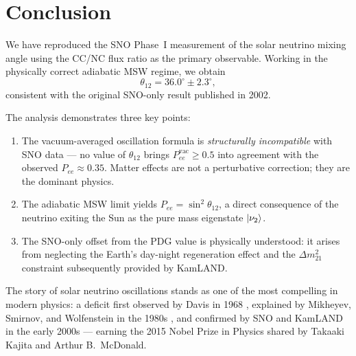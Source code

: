 \documentclass[12pt, a4paper]{article}
\begin{document}
\section{Conclusion}
\label{sec:conclusion}
 
We have reproduced the SNO Phase~I measurement of the solar neutrino
mixing angle using the CC/NC flux ratio as the primary observable.
Working in the physically correct adiabatic MSW regime, we obtain
\[
    \theta_{12} = 36.0^{\circ} \pm 2.3^{\circ},
\]
consistent with the original SNO-only result published in 2002.
 
The analysis demonstrates three key points:
\begin{enumerate}
    \item The vacuum-averaged oscillation formula is \emph{structurally
          incompatible} with SNO data --- no value of $\theta_{12}$
          brings $P_{ee}^{\text{vac}} \geq 0.5$ into agreement with
          the observed $P_{ee} \approx 0.35$.
          Matter effects are not a perturbative correction; they are the
          dominant physics.
 
    \item The adiabatic MSW limit yields $P_{ee} = \sin^2\theta_{12}$,
          a direct consequence of the neutrino exiting the Sun as the
          pure mass eigenstate $\ket{\nu_2}$.
 
    \item The SNO-only offset from the PDG value is physically understood:
          it arises from neglecting the Earth's day-night regeneration
          effect and the $\Delta m^2_{21}$ constraint subsequently
          provided by KamLAND.
\end{enumerate}
 
The story of solar neutrino oscillations stands as one of the most
compelling in modern physics: a deficit first observed by Davis in 1968
\cite{Homestake1968}, explained by Mikheyev, Smirnov, and Wolfenstein
in the 1980s \cite{MSW1985, MSW1986}, and confirmed by SNO and KamLAND
in the early 2000s --- earning the 2015 Nobel Prize in Physics shared
by Takaaki Kajita and Arthur B.~McDonald.
 
\end{document}
